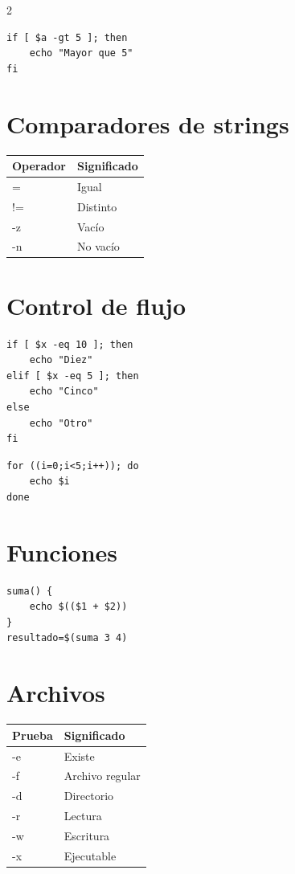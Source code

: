 \documentclass[10pt]{article}
\begin{document}
\begin{multicols}{2}
\begin{lstlisting}
if [ $a -gt 5 ]; then
    echo "Mayor que 5"
fi
\end{lstlisting}

\section*{Comparadores de strings}

\begin{center}
\begin{tabular}{ll}
\toprule
Operador & Significado \\
\midrule
= & Igual \\
!= & Distinto \\
-z & Vacío \\
-n & No vacío \\
\bottomrule
\end{tabular}
\end{center}

\section*{Control de flujo}

\begin{lstlisting}
if [ $x -eq 10 ]; then
    echo "Diez"
elif [ $x -eq 5 ]; then
    echo "Cinco"
else
    echo "Otro"
fi
\end{lstlisting}

\begin{lstlisting}
for ((i=0;i<5;i++)); do
    echo $i
done
\end{lstlisting}

\section*{Funciones}

\begin{lstlisting}
suma() {
    echo $(($1 + $2))
}
resultado=$(suma 3 4)
\end{lstlisting}

\section*{Archivos}

\begin{center}
\begin{tabular}{ll}
\toprule
Prueba & Significado \\
\midrule
-e & Existe \\
-f & Archivo regular \\
-d & Directorio \\
-r & Lectura \\
-w & Escritura \\
-x & Ejecutable \\
\bottomrule
\end{tabular}
\end{center}


\end{multicols}
\end{document}
